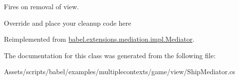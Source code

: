Fires on removal of view. 

Override and place your cleanup code here 

Reimplemented from \hyperlink{classbabel_1_1extensions_1_1mediation_1_1impl_1_1_mediator_a8b818665eda883eac66c83b8468007e9}{babel.\-extensions.\-mediation.\-impl.\-Mediator}.



The documentation for this class was generated from the following file\-:\begin{DoxyCompactItemize}
\item 
Assets/scripts/babel/examples/multiplecontexts/game/view/Ship\-Mediator.\-cs\end{DoxyCompactItemize}
